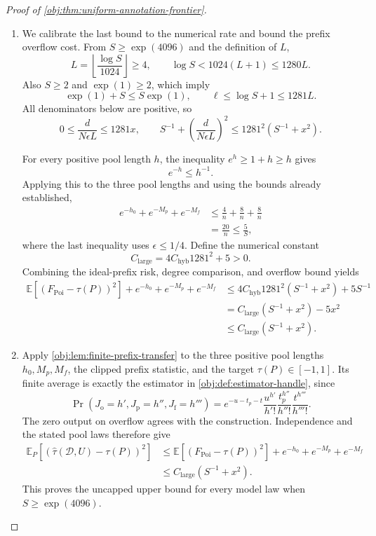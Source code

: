 \documentclass[11pt]{article}
\begin{document}
\begin{proof}[Proof of \cref{obj:thm:uniform-annotation-frontier}]
\begin{enumerate}
\item We calibrate the last bound to the numerical rate and bound the prefix overflow cost. From \(S\ge\exp(4096)\) and the definition of \(L\),
\[
L=\left\lfloor\frac{\log S}{1024}\right\rfloor\ge4,
\qquad
\log S<1024(L+1)\le1280L.
\]
Also \(S\ge2\) and \(\exp(1)\ge2\), which imply
\[
\exp(1)+S\le S\exp(1),
\qquad
\ell\le\log S+1\le1281L.
\]
All denominators below are positive, so
\[
0\le\frac d{N\epsilon L}\le1281x,
\qquad
S^{-1}+\left(\frac d{N\epsilon L}\right)^2
\le1281^2(S^{-1}+x^2).
\]

For every positive pool length \(h\), the inequality \(e^h\ge1+h\ge h\) gives
\[
e^{-h}\le h^{-1}.
\]
Applying this to the three pool lengths and using the bounds already established,
\[
\begin{aligned}
e^{-h_0}+e^{-M_p}+e^{-M_f}
&\le\frac4n+\frac8n+\frac8n\\
&=\frac{20}{n}
\le\frac5S,
\end{aligned}
\]
where the last inequality uses \(\epsilon\le1/4\). Define the numerical constant
\[
C_{\mathrm{large}}=4C_{\mathrm{hyb}}1281^2+5>0.
\]
Combining the ideal-prefix risk, degree comparison, and overflow bound yields
\[
\begin{aligned}
\mathbb E[(F_{\mathrm{Poi}}-\tau(P))^2]
+e^{-h_0}+e^{-M_p}+e^{-M_f}
&\le
4C_{\mathrm{hyb}}1281^2(S^{-1}+x^2)+5S^{-1}\\
&=
C_{\mathrm{large}}(S^{-1}+x^2)-5x^2\\
&\le C_{\mathrm{large}}(S^{-1}+x^2).
\end{aligned}
\]

\item Apply \cref{obj:lem:finite-prefix-transfer} to the three positive pool lengths \(h_0,M_p,M_f\), the clipped prefix statistic, and the target \(\tau(P)\in[-1,1]\). Its finite average is exactly the estimator in \cref{obj:def:estimator-handle}, since
\[
\Pr(J_{\mathrm o}=h',J_{\mathrm p}=h'',J_{\mathrm f}=h''')
=
e^{-u-t_p-t}
\frac{u^{h'}}{h'!}
\frac{t_p^{h''}}{h''!}
\frac{t^{h'''}}{h'''!}.
\]
The zero output on overflow agrees with the construction. Independence and the stated pool laws therefore give
\[
\begin{aligned}
\mathbb E_P[
(\widehat\tau(\mathcal D,U)-\tau(P))^2]
&\le
\mathbb E[(F_{\mathrm{Poi}}-\tau(P))^2]
+e^{-h_0}+e^{-M_p}+e^{-M_f}\\
&\le C_{\mathrm{large}}(S^{-1}+x^2).
\end{aligned}
\]
This proves the uncapped upper bound for every model law when \(S\ge\exp(4096)\).


\end{enumerate}
\end{proof}
\end{document}
